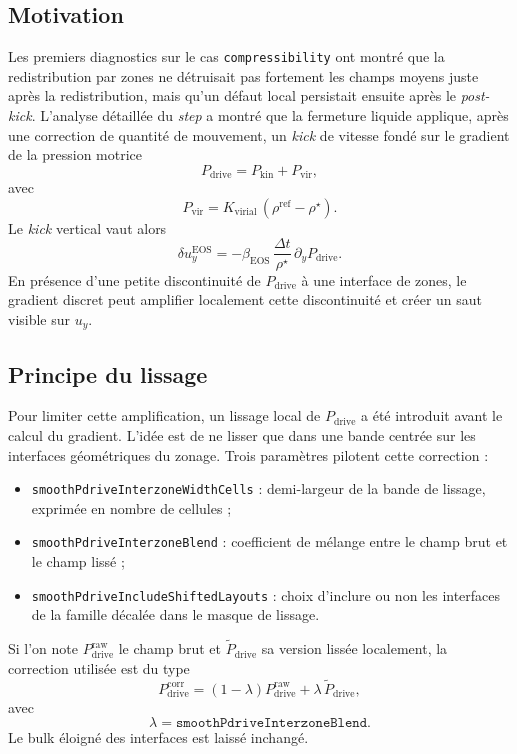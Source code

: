 \documentclass[11pt,a4paper]{article}
\begin{document}
\subsection{Motivation}

Les premiers diagnostics sur le cas \texttt{compressibility} ont montré que la redistribution par zones ne détruisait pas fortement les champs moyens juste après la redistribution, mais qu'un défaut local persistait ensuite après le \emph{post-kick}. L'analyse détaillée du \emph{step} a montré que la fermeture liquide applique, après une correction de quantité de mouvement, un \emph{kick} de vitesse fondé sur le gradient de la pression motrice
\begin{equation}
 P_{\mathrm{drive}} = P_{\mathrm{kin}} + P_{\mathrm{vir}},
\end{equation}
avec
\begin{equation}
 P_{\mathrm{vir}} = K_{\mathrm{virial}}\,(\rho^{\mathrm{ref}} - \rho^{\star}).
\end{equation}
Le \emph{kick} vertical vaut alors
\begin{equation}
 \delta u_y^{\mathrm{EOS}} = -\beta_{\mathrm{EOS}}\,\frac{\Delta t}{\rho^{\star}}\,\partial_y P_{\mathrm{drive}}.
\end{equation}
En présence d'une petite discontinuité de $P_{\mathrm{drive}}$ à une interface de zones, le gradient discret peut amplifier localement cette discontinuité et créer un saut visible sur $u_y$.

\subsection{Principe du lissage}

Pour limiter cette amplification, un lissage local de $P_{\mathrm{drive}}$ a été introduit avant le calcul du gradient. L'idée est de ne lisser que dans une bande centrée sur les interfaces géométriques du zonage. Trois paramètres pilotent cette correction :
\begin{itemize}
  \item \verb|smoothPdriveInterzoneWidthCells| : demi-largeur de la bande de lissage, exprimée en nombre de cellules ;
  \item \verb|smoothPdriveInterzoneBlend| : coefficient de mélange entre le champ brut et le champ lissé ;
  \item \verb|smoothPdriveIncludeShiftedLayouts| : choix d'inclure ou non les interfaces de la famille décalée dans le masque de lissage.
\end{itemize}
Si l'on note $P_{\mathrm{drive}}^{\mathrm{raw}}$ le champ brut et $\widetilde P_{\mathrm{drive}}$ sa version lissée localement, la correction utilisée est du type
\begin{equation}
 P_{\mathrm{drive}}^{\mathrm{corr}}
 =
 (1-\lambda) P_{\mathrm{drive}}^{\mathrm{raw}}
 + \lambda \, \widetilde P_{\mathrm{drive}},
\end{equation}
avec
\begin{equation}
 \lambda = \texttt{smoothPdriveInterzoneBlend}.
\end{equation}
Le bulk éloigné des interfaces est laissé inchangé.
\end{document}
